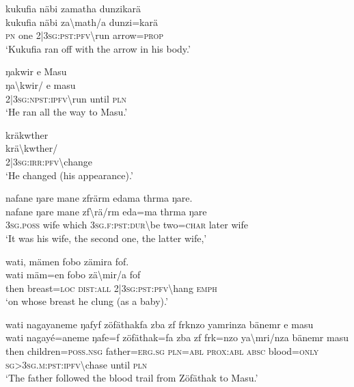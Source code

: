 \ea\label{ex:9:a2330}
kukufia näbi zamatha dunzikarä\\
\gll kukufia	näbi	za{\textbackslash}math/a	dunzi=karä\\
     \textsc{pn}	one	2|3\textsc{sg}:\textsc{pst}:\textsc{pfv}{\textbackslash}run	arrow=\textsc{prop}\\
\glt `Kukufia ran off with the arrow in his body.'
\z

\ea\label{ex:9:a2331}
ŋakwir e Masu\\
\gll ŋa{\textbackslash}kwir/	e	masu\\
     2|3\textsc{sg}:\textsc{npst}:\textsc{ipfv}{\textbackslash}run	until	\textsc{pln}\\
\glt `He ran all the way to Masu.'
\z

\ea\label{ex:9:a2332}
kräkwther\\
\gll krä{\textbackslash}kwther/\\
     2|3\textsc{sg}:\textsc{irr}:\textsc{pfv}{\textbackslash}change\\
\glt `He changed (his appearance).'
\z

\ea\label{ex:9:a2333}
nafane ŋare mane zfrärm edama thrma ŋare.\\
\gll nafane	ŋare	mane	zf{\textbackslash}rä/rm	eda=ma	thrma	ŋare\\
     3\textsc{sg}.\textsc{poss}	wife	which	3\textsc{sg}.\textsc{f}:\textsc{pst}:\textsc{dur}{\textbackslash}be	two=\textsc{char}	later	wife\\
\glt `It was his wife, the second one, the latter wife,'
\z

\ea\label{ex:9:a2334}
wati, mämen fobo zämira fof.\\
\gll wati	mäm=en	fobo	zä{\textbackslash}mir/a	fof\\
     then	breast=\textsc{loc}	\textsc{dist}:\textsc{all}	2|3\textsc{sg}:\textsc{pst}:\textsc{pfv}{\textbackslash}hang	\textsc{emph}\\
\glt `on whose breast he clung (as a baby).'
\z

\ea\label{ex:9:a2336}
wati nagayaneme ŋafyf zöfäthakfa zba zf frknzo yamrinza bänemr e masu\\
\gll wati	nagayé=aneme	ŋafe=f	zöfäthak=fa	zba	zf	frk=nzo	ya{\textbackslash}mri/nza	bänemr	masu\\
     then	children=\textsc{poss}.\textsc{nsg}	father=\textsc{erg}.\textsc{sg}	\textsc{pln}=\textsc{abl}	\textsc{prox}:\textsc{abl}	\textsc{absc}	blood=\textsc{only}	\textsc{sg}>3\textsc{sg}.\textsc{m}:\textsc{pst}:\textsc{ipfv}{\textbackslash}chase	until	\textsc{pln}\\
\glt `The father followed the blood trail from Zöfäthak to Masu.'
\z

